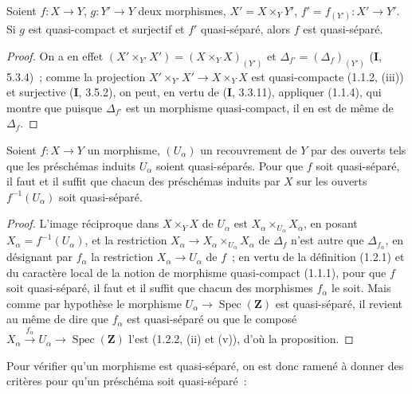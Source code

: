 \begin{proposition}[1.2.5]
\label{IV.1.2.5-fr}
Soient $f:X\to Y$, $g:Y'\to Y$ deux morphismes,
$X'=X\times_Y Y'$, $f'=f_{(Y')}:X'\to Y'$. Si $g$ est quasi-compact et
surjectif et $f'$ quasi-séparé, alors $f$ est quasi-séparé.
\end{proposition}

\begin{proof}
On a en effet $(X'\times_{Y'}X')=(X\times_YX)_{(Y')}$ et
$\Delta_{f'}=(\Delta_f)_{(Y')}$ (\textbf{I}, 5.3.4)~; comme la projection
$X'\times_{Y'}X'\to X\times_YX$ est quasi-compacte (1.1.2, (iii)) et
surjective (\textbf{I}, 3.5.2), on peut, en vertu de (\textbf{I}, 3.3.11), appliquer (1.1.4),
qui montre que puisque $\Delta_{f'}$ est un morphisme quasi-compact, il en est
de même de $\Delta_f$.
\end{proof}

\begin{proposition}[1.2.6]
\label{IV.1.2.6-fr}
Soient $f:X\to Y$ un morphisme, $(U_\alpha)$ un recouvrement de $Y$ par des
ouverts tels que les préschémas induits $U_\alpha$ soient quasi-séparés. Pour
que $f$ soit quasi-séparé, il faut et il suffit que chacun des préschémas
induits par $X$ sur les ouverts $f^{-1}(U_\alpha)$ soit quasi-séparé.
\end{proposition}

\begin{proof}
L'image réciproque dans $X\times_YX$ de $U_\alpha$ est
$X_\alpha\times_{U_\alpha}X_\alpha$, en posant
$X_\alpha=f^{-1}(U_\alpha)$, et la restriction
$X_\alpha\to X_\alpha\times_{U_\alpha}X_\alpha$ de $\Delta_f$ n'est autre
que $\Delta_{f_\alpha}$, en désignant par $f_\alpha$ la restriction
$X_\alpha\to U_\alpha$ de $f$~; en vertu de la définition (1.2.1) et du
caractère local de la notion de morphisme quasi-compact (1.1.1), pour que $f$
soit quasi-séparé, il faut et il suffit que chacun des morphismes $f_\alpha$
le soit. Mais comme par hypothèse le morphisme
$U_\alpha\to\operatorname{Spec}(\mathbf Z)$ est quasi-séparé, il revient au
même de dire que $f_\alpha$ est quasi-séparé ou que le composé
$X_\alpha\xrightarrow{f_\alpha}U_\alpha\to\operatorname{Spec}(\mathbf Z)$
l'est (1.2.2, (ii) et (v)), d'où la proposition.
\end{proof}


Pour vérifier qu'un morphisme est quasi-séparé, on est donc ramené à donner
des critères pour qu'un préschéma soit quasi-séparé~:


